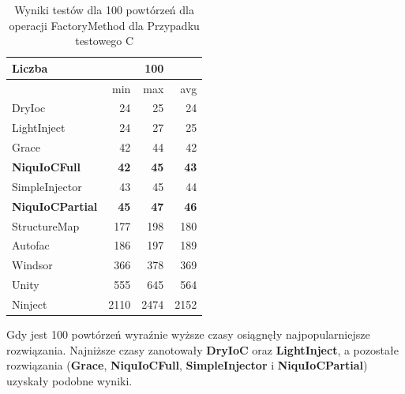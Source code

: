 \documentclass[12pt]{article}
\begin{document}
\begin{table}[H]
\captionsetup{belowskip=0pt,aboveskip=0pt}
\begin{center}
\begin{small}
	\begin{tabular}{ | l | r r r | }
    		\hline
Liczba & & 100 & \\ \hline
 & min & max & avg \\ \hline
DryIoc & 24 & 25 & 24 \\ \hline
LightInject & 24 & 27 & 25 \\ \hline
Grace & 42 & 44 & 42 \\ \hline
\textbf{NiquIoCFull} & \textbf{42} & \textbf{45} & \textbf{43} \\ \hline
SimpleInjector & 43 & 45 & 44 \\ \hline
\textbf{NiquIoCPartial} & \textbf{45} & \textbf{47} & \textbf{46} \\ \hline
StructureMap & 177 & 198 & 180 \\ \hline
Autofac & 186 & 197 & 189 \\ \hline
Windsor & 366 & 378 & 369 \\ \hline
Unity & 555 & 645 & 564 \\ \hline
Ninject & 2110 & 2474 & 2152 \\ \hline
  	\end{tabular}
\end{small}
\end{center}
\caption{Wyniki testów dla 100 powtórzeń dla operacji FactoryMethod dla Przypadku testowego C}
\label{TestCaseC_FactoryMethod100}
\end{table}
Gdy jest 100 powtórzeń wyraźnie wyższe czasy osiągnęły najpopularniejsze rozwiązania. Najniższe czasy zanotowały \textbf{DryIoC} oraz \textbf{LightInject}, a pozostałe rozwiązania (\textbf{Grace}, \textbf{NiquIoCFull}, \textbf{SimpleInjector} i \textbf{NiquIoCPartial}) uzyskały podobne wyniki.
\\ \\
\end{document}

